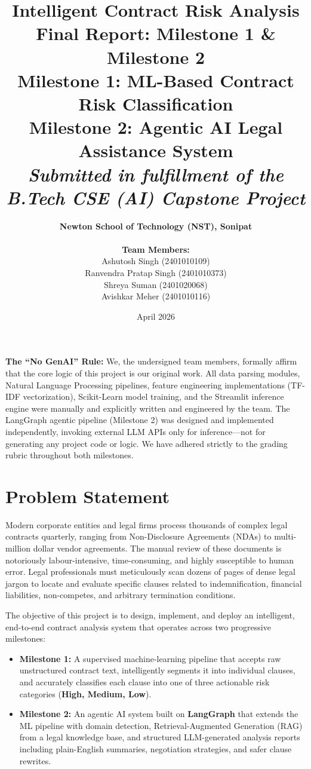 \documentclass[12pt,a4paper]{article}
\title{
    \vspace{-1.5cm}
    \textbf{\Huge Intelligent Contract Risk Analysis} \\
    \vspace{0.6cm}
    \Large Final Report: Milestone 1 \& Milestone 2 \\
    \vspace{0.3cm}
    \large Milestone 1: ML-Based Contract Risk Classification \\
    \large Milestone 2: Agentic AI Legal Assistance System \\
    \vspace{0.4cm}
    \normalsize \textit{Submitted in fulfillment of the B.Tech CSE (AI) Capstone Project} \\
    \vspace{-0.2cm}
}
\author{
    \textbf{Newton School of Technology (NST), Sonipat} \\
    \vspace{0.8cm} \\
    \textbf{Team Members:} \\
    Ashutosh Singh (2401010109) \\
    Ranvendra Pratap Singh (2401010373) \\
    Shreya Suman (2401020068) \\
    Avishkar Meher (2401010116)
}
\date{April 2026}
\begin{document}
\maketitle
\thispagestyle{empty}
\vspace{1cm}

\begin{tcolorbox}[colback=gray!5, colframe=gray!50,
    title=\textbf{Declaration of Technical Integrity}]
\textbf{The ``No GenAI'' Rule:} We, the undersigned team members, formally affirm
that the core logic of this project is our original work. All data parsing modules,
Natural Language Processing pipelines, feature engineering implementations
(TF-IDF vectorization), Scikit-Learn model training, and the Streamlit inference
engine were manually and explicitly written and engineered by the team. The
LangGraph agentic pipeline (Milestone 2) was designed and implemented
independently, invoking external LLM APIs only for inference---not for generating
any project code or logic. We have adhered strictly to the grading rubric throughout
both milestones.
\end{tcolorbox}

\newpage
\tableofcontents
\newpage

\section{Problem Statement}
\label{sec:problem}

Modern corporate entities and legal firms process thousands of complex legal
contracts quarterly, ranging from Non-Disclosure Agreements (NDAs) to multi-million
dollar vendor agreements. The manual review of these documents is notoriously
labour-intensive, time-consuming, and highly susceptible to human error. Legal
professionals must meticulously scan dozens of pages of dense legal jargon to
locate and evaluate specific clauses related to indemnification, financial
liabilities, non-competes, and arbitrary termination conditions.

The objective of this project is to design, implement, and deploy an intelligent,
end-to-end contract analysis system that operates across two progressive milestones:

\begin{itemize}[leftmargin=1.5cm]
    \item \textbf{Milestone 1:} A supervised machine-learning pipeline that accepts
    raw unstructured contract text, intelligently segments it into individual clauses,
    and accurately classifies each clause into one of three actionable risk categories
    (\textbf{High, Medium, Low}).

    \item \textbf{Milestone 2:} An agentic AI system built on \textbf{LangGraph}
    that extends the ML pipeline with domain detection, Retrieval-Augmented Generation
    (RAG) from a legal knowledge base, and structured LLM-generated analysis reports
    including plain-English summaries, negotiation strategies, and safer clause
    rewrites.
\end{itemize}
\end{document}
